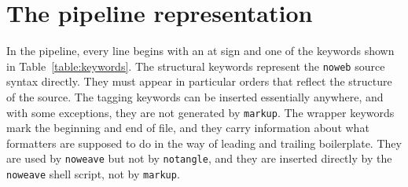 \documentclass{article}
\begin{document}
\section{The pipeline representation}

In the pipeline, every line begins with an at sign and one of the
keywords shown in Table~\ref{table:keywords}.
The structural keywords 
represent the {\tt noweb} source syntax directly.
They must appear in particular orders that reflect the
structure of the source.
The tagging keywords can be inserted
essentially anywhere, and with some exceptions, they are not generated
by {\tt markup}.
The wrapper keywords
mark the beginning and end of file,
and they carry information about what formatters are supposed to do in
the way of leading and trailing boilerplate.
They are used by {\tt noweave} but not by {\tt notangle}, and they are
inserted directly by the {\tt noweave} shell script, not by {\tt markup}.
\end{document}
